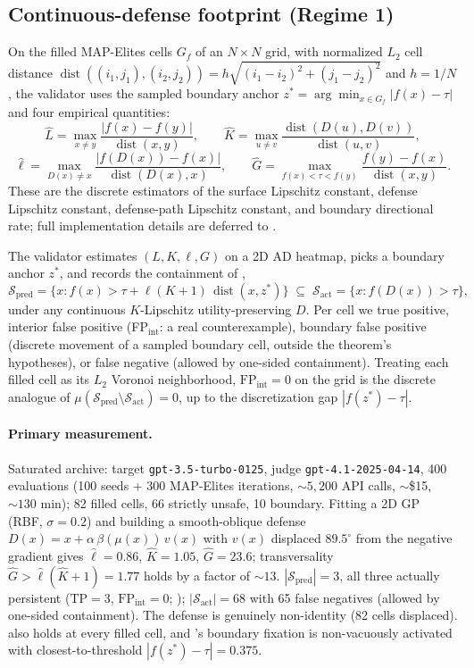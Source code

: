 \documentclass[11pt]{article}
\newcommand{\dist}{\operatorname{dist}}
\begin{document}
\subsection{Continuous-defense footprint (Regime 1)}
\label{sec:continuous-regime}
\label{sec:live-validation}

On the filled MAP-Elites cells $G_f$ of an $N\times N$ grid, with
normalized $L_2$ cell distance
$\dist((i_1,j_1),(i_2,j_2)) = h\sqrt{(i_1-i_2)^2 + (j_1-j_2)^2}$ and
$h=1/N$, the validator uses the sampled boundary anchor
$z^*=\arg\min_{x\in G_f}|f(x)-\tau|$ and four empirical quantities:
\[
\hat L=\max_{x\neq y}\frac{|f(x)-f(y)|}{\dist(x,y)},\qquad
\hat K=\max_{u\neq v}\frac{\dist(D(u),D(v))}{\dist(u,v)},
\]
\[
\hat\ell=\max_{D(x)\neq x}\frac{|f(D(x))-f(x)|}{\dist(D(x),x)},\qquad
\hat G=\max_{f(x)<\tau<f(y)}\frac{f(y)-f(x)}{\dist(x,y)}.
\]
These are the discrete estimators of the surface Lipschitz constant,
defense Lipschitz constant, defense-path Lipschitz constant, and
boundary directional rate; full implementation details are deferred to
.

The validator estimates $(L, K, \ell, G)$ on a 2D AD heatmap, picks a
boundary anchor $z^{*}$, and records the containment of
,
\[
\mathcal{S}_{\text{pred}} = \{x : f(x) > \tau + \ell(K{+}1)\,\dist(x,z^*)\}
\;\subseteq\;
\mathcal{S}_{\text{act}} = \{x : f(D(x)) > \tau\},
\]
under any continuous $K$-Lipschitz utility-preserving $D$. Per cell we
true positive, interior false positive
(FP$_{\mathrm{int}}$: a real counterexample), boundary false positive
(discrete movement of a sampled boundary cell, outside the theorem's
hypotheses), or false negative (allowed by one-sided containment).
Treating each filled cell as its $L_2$ Voronoi neighborhood,
$\mathrm{FP}_{\mathrm{int}}=0$ on the grid is the discrete analogue of
$\mu(\mathcal{S}_{\text{pred}}\setminus\mathcal{S}_{\text{act}})=0$,
up to the discretization gap $|f(z^*)-\tau|$.

\paragraph{Primary measurement.}
Saturated archive: target \texttt{gpt-3.5-turbo-0125}, judge
\texttt{gpt-4.1-2025-04-14}, 400 evaluations (100 seeds + 300
MAP-Elites iterations, $\sim 5{,}200$ API calls, $\sim$\$15,
$\sim 130$ min); 82 filled cells, 66 strictly unsafe, 10 boundary.
Fitting a 2D GP (RBF, $\sigma=0.2$) and building a smooth-oblique
defense $D(x) = x + \alpha\,\beta(\mu(x))\,v(x)$ with $v(x)$ displaced
$89.5^\circ$ from the negative gradient gives
$\hat\ell = 0.86$, $\hat K = 1.05$, $\hat G = 23.6$; transversality
$\hat G > \hat\ell(\hat K{+}1) = 1.77$ holds by a factor of $\sim13$.
$|\mathcal{S}_{\text{pred}}| = 3$, all three actually persistent
($\mathrm{TP}=3$, $\mathrm{FP}_{\mathrm{int}}=0$;
); $|\mathcal{S}_{\text{act}}| = 68$
with 65 false negatives (allowed by one-sided containment). The defense
is genuinely non-identity (82 cells displaced). 
also holds at every filled cell, and 's boundary
fixation is non-vacuously activated with closest-to-threshold
$|f(z^*)-\tau| = 0.375$.
\end{document}

